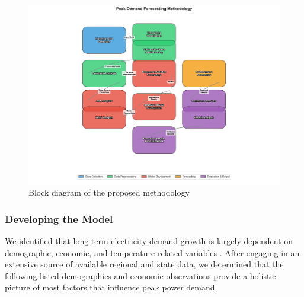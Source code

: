 \documentclass[12pt]{article}
\begin{document}
\begin{figure}[H]
  \centering
  \includegraphics[scale=.5]{Peak Demand Model.png}
  \caption{Block diagram of the proposed methodology}
  \label{fig:methodology}
\end{figure}

\subsubsection{Developing the Model}
We identified that long-term electricity demand growth is largely dependent on demographic, economic, and temperature-related variables \cite{Wang2019}. After engaging in an extensive source of available regional and state data, we determined that the following listed demographics and economic observations provide a holistic picture of most factors that influence peak power demand.
\end{document}
